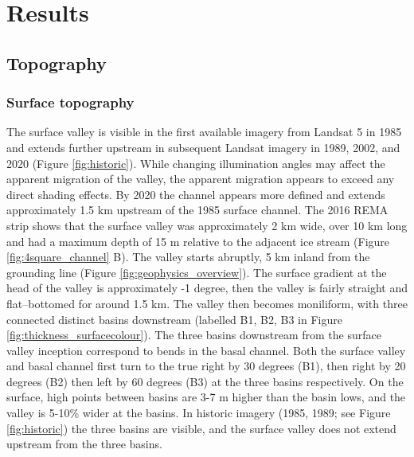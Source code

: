 
\newpage

\section{Results} \label{sec:results}

\subsection{Topography} \label{sec:topography}

\subsubsection{Surface topography} \label{sec:surfacetopog}
The surface valley is visible in the first available imagery from Landsat 5 in 1985 and extends further upstream in subsequent Landsat imagery in 1989, 2002, and 2020 (Figure \ref{fig:historic}). While changing illumination angles may affect the apparent migration of the valley, the apparent migration appears to exceed any direct shading effects. By 2020 the channel appears more defined and extends approximately 1.5 km upstream of the 1985 surface channel. The 2016 REMA strip shows that the surface valley was approximately 2 km wide, over 10 km long and had a maximum depth of 15 m relative to the adjacent ice stream (Figure \ref{fig:4square_channel} B).  The valley starts abruptly, 5 km inland from the \cite{depoorter2013amii} grounding line (Figure \ref{fig:geophysics_overview}). The surface gradient at the head of the valley is approximately -1 degree, then the valley is fairly straight and flat--bottomed for around 1.5 km. The valley then becomes moniliform, with three connected distinct basins downstream (labelled B1, B2, B3 in Figure \ref{fig:thickness_surfacecolour}).
The three basins downstream from the surface valley inception correspond to bends in the basal channel. Both the surface valley and basal channel first turn to the true right by 30 degrees (B1), then right by 20 degrees (B2) then left by 60 degrees (B3) at the three basins respectively. On the surface, high points between basins are 3-7 m higher than the basin lows, and the valley is 5-10\% wider at the basins.
In historic imagery (1985, 1989; see Figure \ref{fig:historic}) the three basins are visible, and the surface valley does not extend upstream from the three basins. 


